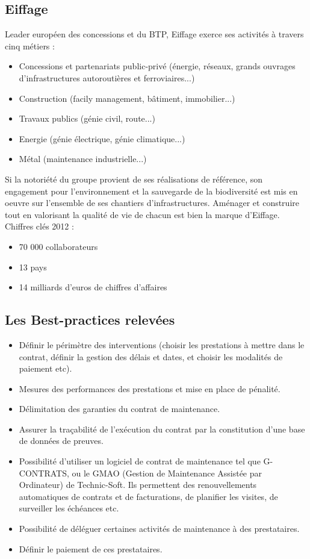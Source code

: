     \subsection{Eiffage}
    	Leader européen des concessions et du BTP, Eiffage exerce ses activités à travers cinq métiers :
    \begin{itemize}
    	\item Concessions et partenariats public-privé (énergie, réseaux, grands ouvrages d'infrastructures autoroutières et ferroviaires...)
    	\item Construction (facily management, bâtiment, immobilier...)
    	\item Travaux publics (génie civil, route...)
    	\item Energie (génie électrique, génie climatique...)
    	\item Métal (maintenance industrielle...)
    \end{itemize}
    \bigbreak
    	Si la notoriété du groupe provient de ses réalisations de référence, son engagement pour l'environnement et la sauvegarde de la biodiversité est mis en oeuvre sur l'ensemble de ses chantiers d'infrastructures. Aménager et construire tout en valorisant la qualité de vie de chacun est bien la marque d'Eiffage.
    \bigbreak
    Chiffres clés 2012 :
    \begin{itemize}
    	\item 70 000 collaborateurs
    	\item 13 pays
    	\item 14 milliards d'euros de chiffres d'affaires
    \end{itemize}

    \subsection{Les Best-practices relevées}
    \begin{itemize}
    	\item Définir le périmètre des interventions (choisir les prestations à mettre dans le contrat, définir la gestion des délais et dates, et choisir les modalités de paiement etc).
    	\item Mesures des performances des prestations et mise en place de pénalité.
    	\item Délimitation des garanties du contrat de maintenance.
    	\item Assurer la traçabilité de l'exécution du contrat par la constitution d'une base de données de preuves.
    	\item Possibilité d'utiliser un logiciel de contrat de maintenance tel que G-CONTRATS, ou le GMAO (Gestion de Maintenance Assistée par Ordinateur) de Technic-Soft. Ils permettent des renouvellements automatiques de contrats et de facturations, de planifier les visites, de surveiller les échéances etc.
    	\item Possibilité de déléguer certaines activités de maintenance à des prestataires.
    	\item Définir le paiement de ces prestataires.
    \end{itemize}

